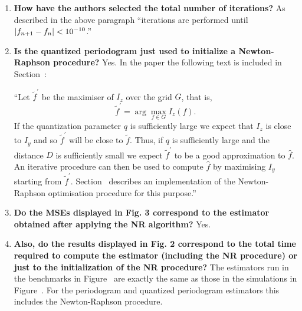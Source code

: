 \documentclass[a4paper,10pt]{article}
\begin{document}
\begin{enumerate}
\begin{enumerate}

\item \textbf{How have the authors selected the total number of iterations?} 
As described in the above paragraph ``iterations are performed until $\vert f_{n+1}-f_n \vert < 10^{-10}$.''




\item \textbf{Is the quantized periodogram just used to initialize a Newton-Raphson procedure?}
Yes.  In the paper the following text is included in Section~:

``Let $\widetilde{f}^\prime$ be the maximiser of $I_z$ over the grid $G$, that is,
\[
\widetilde{f}^\prime = \arg\max_{f \in G} I_z(f).
\]
If the quantization parameter $q$ is sufficiently large we expect that $I_z$ is close to $I_y$ and so $\widetilde{f}^\prime$ will be close to $\widetilde{f}$.  Thus, if $q$ is sufficiently large and the distance $D$ is sufficiently small we expect $\widetilde{f}^\prime$ to be a good approximation to $\hat{f}$.  An iterative procedure %
can then be used to compute $\hat{f}$ by maximising $I_y$ starting from $\widetilde{f}^\prime$.  Section~ describes an implementation of the Newton-Raphson optimisation procedure for this purpose.''

\item \textbf{Do the MSEs displayed in Fig. 3 correspond to the estimator obtained after applying the NR algorithm?}
Yes.

\item \textbf{Also, do the results displayed in Fig. 2 correspond to the total time
required to compute the estimator (including the NR procedure) or just to the
initialization of the NR procedure?}
The estimators run in the benchmarks in Figure~ are exactly the same as those in the simulations in Figure~.  For the periodogram and quantized periodogram estimators this includes the Newton-Raphson procedure.


\end{enumerate}
\end{enumerate}
\end{document}
